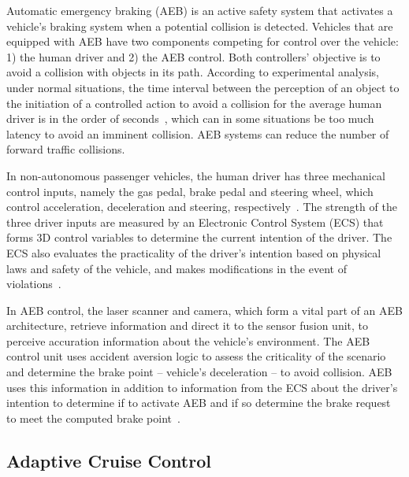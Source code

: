 \documentclass{article}
\begin{document}
Automatic emergency braking (AEB) is an active safety system that activates a vehicle’s braking system when a potential collision is detected. Vehicles that are equipped with AEB have two components competing for control over the vehicle: 1) the human driver and 2) the AEB control. Both controllers’ objective is to avoid a collision with objects in its path. According to experimental analysis, under normal situations, the time interval between the perception of an object to the initiation of a controlled action to avoid a collision for the average human driver is in the order of seconds~\cite{Amimi2017}, which can in some situations be too much latency to avoid an imminent collision. AEB systems can reduce the number of forward traffic collisions.


In non-autonomous  passenger vehicles, the human driver has three mechanical control inputs, namely the gas pedal, brake pedal and steering wheel, which control acceleration, deceleration and steering, respectively~\cite{Amimi2017}. The strength of the three driver inputs are measured by an Electronic Control System (ECS) that forms 3D control variables to determine the current intention of the driver. The ECS also evaluates the practicality of the driver’s intention based on physical laws and safety of the vehicle, and makes modifications in the event of violations~\cite{Amimi2017}.

In AEB control, the laser scanner and camera, which form a vital part of an AEB architecture, retrieve information and direct it to the sensor fusion unit, to perceive accuration information about the vehicle’s environment. The AEB control unit uses accident aversion logic to assess the criticality of the scenario and determine the brake point -- vehicle’s deceleration -- to avoid collision. AEB uses this information in addition to information from the ECS about the driver's intention to determine if to activate AEB and if so determine the brake request to meet the computed brake point~\cite{Amimi2017}.


\subsection{Adaptive Cruise Control}
\end{document}
